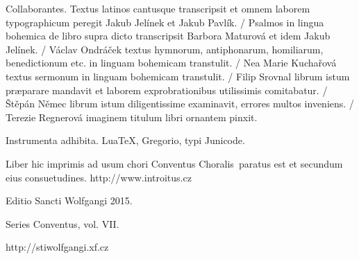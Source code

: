 \documentclass[a4paper, twoside, 12pt]{article}
\newcommand{\annusEditionis}{2015}
\begin{document}
Collaborantes.
Textus latinos cantusque transcripsit et omnem laborem typographicum peregit
Jakub Jelínek et Jakub Pavlík. /
Psalmos in lingua bohemica de libro supra dicto transcripsit
Barbora Maturová et idem Jakub Jelínek. /
Václav Ondráček textus hymnorum, antiphonarum, homiliarum, benedictionum etc.
in linguam bohemicam transtulit. /
Nea Marie Kuchařová textus sermonum in linguam bohemicam transtulit. /
Filip Srovnal librum istum præparare mandavit et laborem exprobrationibus
utilissimis comitabatur. /
Štěpán Němec librum istum diligentissime examinavit, errores multos
inveniens. /
Terezie Regnerová imaginem titulum libri ornantem pinxit.

Instrumenta adhibita.
LuaTeX, %
Gregorio, %
typi Junicode. %

\begin{center}
Liber hic imprimis ad usum chori
\guillemotright Conventus Choralis\guillemotleft\
paratus est
et secundum eius consuetudines.
http://www.introitus.cz

\vfill

{\large Editio Sancti Wolfgangi \annusEditionis.}

\vfill

Series \guillemotright Conventus\guillemotleft, vol. VII.

\vfill

http://stiwolfgangi.xf.cz

\end{center}

\vfill
\end{document}
